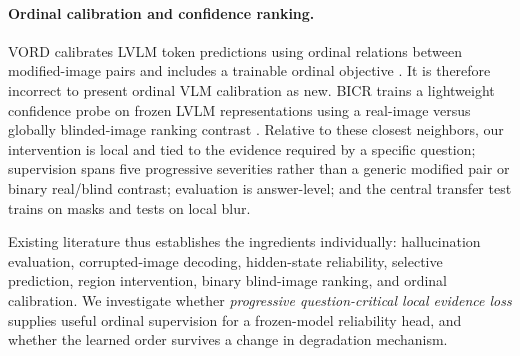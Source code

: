 \paragraph{Ordinal calibration and confidence ranking.}
VORD calibrates LVLM token predictions using ordinal relations between modified-image pairs and includes a trainable ordinal objective \citep{neo2024vord}. It is therefore incorrect to present ordinal VLM calibration as new. BICR trains a lightweight confidence probe on frozen LVLM representations using a real-image versus globally blinded-image ranking contrast \citep{khanmohammadi2026bicr}. Relative to these closest neighbors, our intervention is local and tied to the evidence required by a specific question; supervision spans five progressive severities rather than a generic modified pair or binary real/blind contrast; evaluation is answer-level; and the central transfer test trains on masks and tests on local blur.

Existing literature thus establishes the ingredients individually: hallucination evaluation, corrupted-image decoding, hidden-state reliability, selective prediction, region intervention, binary blind-image ranking, and ordinal calibration. We investigate whether \emph{progressive question-critical local evidence loss} supplies useful ordinal supervision for a frozen-model reliability head, and whether the learned order survives a change in degradation mechanism.
